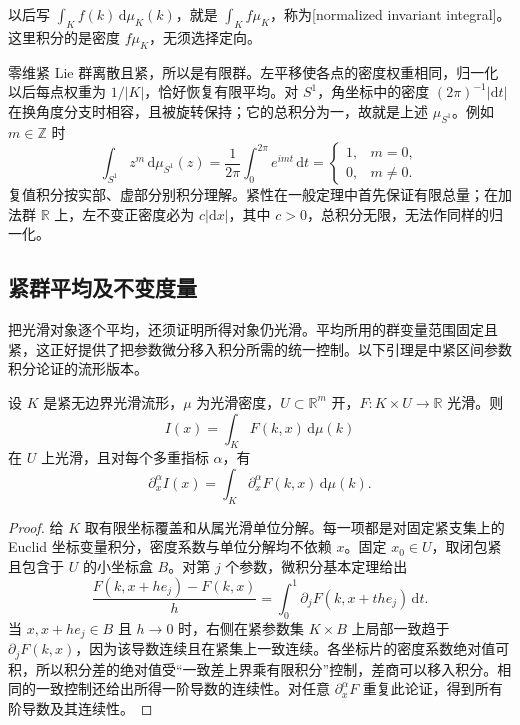 以后写 \(\int_K f(k)\,\mathrm{d}\mu_K(k)\)，就是 \(\int_K f\mu_K\)，称为[normalized invariant integral]。这里积分的是密度 \(f\mu_K\)，无须选择定向。

\begin{example}\label{g1:exm:compact-integral-circle-finite}
	零维紧 Lie 群离散且紧，所以是有限群。左平移使各点的密度权重相同，归一化以后每点权重为 \(1/|K|\)，恰好恢复有限平均。对 \(S^1\)，角坐标中的密度 \((2\pi)^{-1}|\mathrm{d}t|\) 在换角度分支时相容，且被旋转保持；它的总积分为一，故就是上述 \(\mu_{S^1}\)。例如 \(m\in\mathbb Z\) 时
	\[
		\int_{S^1} z^m\,\mathrm{d}\mu_{S^1}(z)
		=\frac1{2\pi}\int_0^{2\pi}e^{imt}\,\mathrm{d}t
		=\begin{cases}1,&m=0,\\0,&m\ne0.\end{cases}
	\]
	复值积分按实部、虚部分别积分理解。紧性在一般定理中首先保证有限总量；在加法群 \(\mathbb R\) 上，左不变正密度必为 \(c|\mathrm{d}x|\)，其中 \(c>0\)，总积分无限，无法作同样的归一化。
\end{example}

\subsection{紧群平均及不变度量}
\label{g1:subsec:1703:02}

把光滑对象逐个平均，还须证明所得对象仍光滑。平均所用的群变量范围固定且紧，这正好提供了把参数微分移入积分所需的统一控制。以下引理是中紧区间参数积分论证的流形版本。

\begin{lemma}\label{g1:lem:compact-parameter-integral}
	设 \(K\) 是紧无边界光滑流形，\(\mu\) 为光滑密度，\(U\subset\mathbb R^m\) 开，\(F:K\times U\to\mathbb R\) 光滑。则
	\[
		I(x)=\int_K F(k,x)\,\mathrm{d}\mu(k)
	\]
	在 \(U\) 上光滑，且对每个多重指标 \(\alpha\)，有
	\[
		\partial_x^\alpha I(x)
		=\int_K\partial_x^\alpha F(k,x)\,\mathrm{d}\mu(k).
	\]
\end{lemma}
\begin{proof}
	给 \(K\) 取有限坐标覆盖和从属光滑单位分解。每一项都是对固定紧支集上的 Euclid 坐标变量积分，密度系数与单位分解均不依赖 \(x\)。固定 \(x_0\in U\)，取闭包紧且包含于 \(U\) 的小坐标盒 \(B\)。对第 \(j\) 个参数，微积分基本定理给出
	\[
		\frac{F(k,x+he_j)-F(k,x)}{h}
		=\int_0^1\partial_jF(k,x+the_j)\,\mathrm{d}t.
	\]
	当 \(x,x+he_j\in B\) 且 \(h\to0\) 时，右侧在紧参数集 \(K\times B\) 上局部一致趋于 \(\partial_jF(k,x)\)，因为该导数连续且在紧集上一致连续。各坐标片的密度系数绝对值可积，所以积分差的绝对值受“一致差上界乘有限积分”控制，差商可以移入积分。相同的一致控制还给出所得一阶导数的连续性。对任意 \(\partial_x^\alpha F\) 重复此论证，得到所有阶导数及其连续性。
\end{proof}


